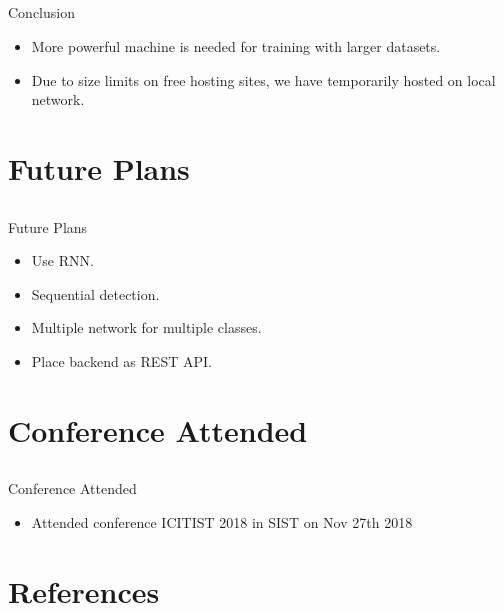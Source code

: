 \documentclass{beamer}
\begin{document}
\subsection{}
\begin{frame}{Conclusion}
\begin{itemize}
\item{More powerful machine is needed for training with larger datasets.}
\item{Due to size limits on free hosting sites, we have temporarily hosted on local network.}

\end{itemize}
\end{frame}


\section{Future Plans}
\subsection{}
\begin{frame}{Future Plans}
\begin{itemize}
\item{Use RNN.}
\item{Sequential detection.}
\item{Multiple network for multiple classes.}
\item{Place backend as REST API.}
\end{itemize}
\end{frame}


\section{Conference Attended}
\subsection{}
\begin{frame}{Conference Attended}
\begin{itemize}
\item{Attended conference ICITIST 2018 in SIST on Nov 27th 2018}

\end{itemize}
\end{frame}



\section{References}
\end{document}
